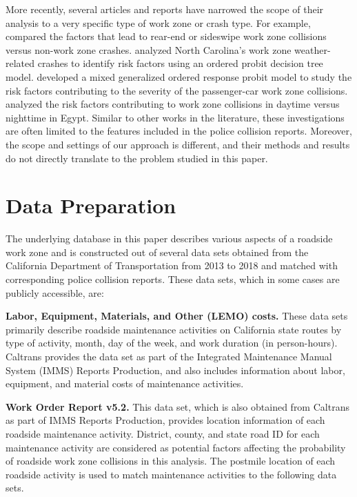 \documentclass[10pt,a4paper]{article}
\begin{document}
More recently, several articles and reports have narrowed the scope of their analysis to a very specific type of work zone or crash type. For example, \cite{silverstein2014work} compared the factors that lead to rear-end or sideswipe work zone collisions versus non-work zone crashes. \cite{ghasemzadeh2017tree} analyzed North Carolina's work zone weather-related crashes to identify risk factors using an ordered probit decision tree model. \cite{osman2018analysis} developed a mixed generalized ordered response probit model to study the risk factors contributing to the severity of the passenger-car work zone collisions. \cite{zhang2019crash} analyzed the risk factors contributing to work zone collisions in daytime versus nighttime in Egypt. Similar to other works in the literature, these investigations are often limited to the features included in the police collision reports. Moreover, the scope and settings of our approach is different, and their methods and results do not directly translate to the problem studied in this paper.

\section{Data Preparation} \label{se:data}
The underlying database in this paper describes various aspects of a roadside work zone and is constructed out of several data sets obtained from the California Department of Transportation from 2013 to 2018 and matched with corresponding police collision reports. These data sets, which in some cases are publicly accessible, are:

\noindent\textbf{Labor, Equipment, Materials, and Other (LEMO) costs.} These data sets primarily describe roadside maintenance activities on California state routes by type of activity, month, day of the week, and work duration (in person-hours). Caltrans provides the data set as part of the Integrated Maintenance Manual System (IMMS) Reports Production, and also includes information about labor, equipment, and material costs of maintenance activities.

\noindent\textbf{Work Order Report v5.2.} This data set, which is also obtained from Caltrans as part of IMMS Reports Production, provides location information of each roadside maintenance activity. District, county, and state road ID for each maintenance activity are considered as potential factors affecting the probability %
of roadside work zone collisions in this analysis. The postmile location of each roadside activity is used to match maintenance activities to the following data sets.
\end{document}
